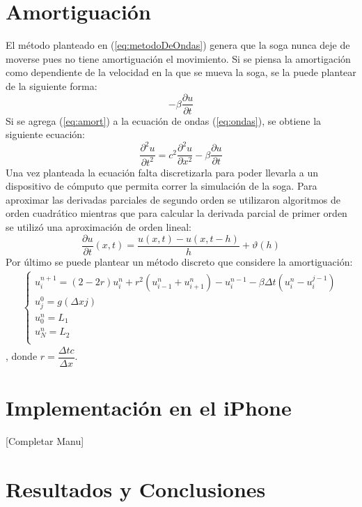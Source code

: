 \documentclass[11pt,a4paper]{emulateapj}
\begin{document}
\section{Amortiguación}
El método planteado en (\ref{eq:metodoDeOndas}) genera que la soga nunca deje de moverse pues no tiene amortiguación el movimiento. Si se piensa la amortigación como dependiente de la velocidad en la que se mueva la soga, se la puede plantear de la siguiente forma:
\begin{equation}
\label{eq:amort}
-\beta \frac{\partial u}{\partial t}
\end{equation}
Si se agrega (\ref{eq:amort}) a la ecuación de ondas (\ref{eq:ondas}), se obtiene la siguiente ecuación:
\begin{equation}
\label{eq:amort}
\frac{\partial ^2 u}{\partial t^2} = c^2 \frac{\partial ^2 u}{\partial x^2} - \beta \frac{\partial u}{\partial t} 
\end{equation}
Una vez planteada la ecuación falta discretizarla para poder llevarla a un dispositivo de cómputo que permita correr la simulación de la soga. Para aproximar las derivadas parciales de segundo orden se utilizaron algoritmos de orden cuadrático mientras que para calcular la derivada parcial de primer orden se utilizó una aproximación de orden lineal:
\begin{equation}
\frac{\partial u}{\partial t}(x,t) = \frac{u(x,t) - u(x,t-h)}{h} +\vartheta(h)
\end{equation}
Por último se puede plantear un método discreto que considere la amortiguación:
\begin{eqnarray}
	\label{eq:metodoDeOndas}
	\left\{
		\begin{matrix}
			u_i^{n+1} = (2-2r) u_i^n + r^2 (u_{i-1}^n+u_{i+1}^n) - u_i^{n-1} - \beta\Delta t(u_i^n - u_i^{j-1})\\
			u_j^0 = g(\Delta x j)\\
			u_0^n = L_1\\ 
			u_N^n = L_2\\
		\end{matrix} \right.
\end{eqnarray}	
, donde $r = \dfrac{\Delta t c}{\Delta x}$.

\section{Implementación en el iPhone}
[Completar Manu]
\section{Resultados y Conclusiones}
\label{sec:resultadosyconclusiones}
\end{document}
